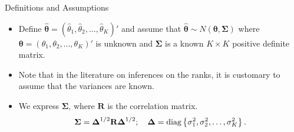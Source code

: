 \documentclass[
  11pt,
  ignorenonframetext,
]{beamer}
\providecommand{\tightlist}{%
  \setlength{\itemsep}{0pt}\setlength{\parskip}{0pt}}
\begin{document}
\begin{frame}{Definitions and Assumptions}
\label{definitions-and-assumptions}
\begin{itemize}[<+->]
\tightlist
\item
  Define
  \(\hat{\boldsymbol{\theta}}=(\hat{\theta}_1,\hat{\theta}_2,\ldots,\hat{\theta}_K)'\)
  and assume that
  \(\hat{\boldsymbol{\theta}}\sim N(\boldsymbol{\theta},\boldsymbol{\Sigma})\)
  where \(\boldsymbol{\theta}=(\theta_1,\theta_2,\ldots,\theta_K)'\) is
  unknown and \(\boldsymbol{\Sigma}\) is a known \(K \times K\) positive
  definite matrix.
\item
  Note that in the literature on inferences on the ranks, it is
  customary to assume that the variances are known.
\item
  We express \(\boldsymbol{\Sigma}\), where \(\mathbf{R}\) is the
  correlation matrix. \begin{equation}
  \boldsymbol{\Sigma} = \boldsymbol{\Delta}^{1/2} \mathbf{R} \boldsymbol{\Delta}^{1/2}; \quad \boldsymbol{\Delta} = \text{diag} \left\{ \sigma^2_1, \sigma^2_2, \dots, \sigma^2_K \right\}.
  \notag
  \end{equation}
\end{itemize}

\end{frame}
\end{document}
